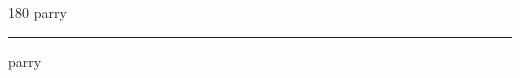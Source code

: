 
\begin{frame}
\begin{center}
\begin{turn}{180}
{\fontsize{2.5cm}{1em}\selectfont parry}
\end{turn}
\vspace{1em}\par  
\hrule
\vspace{1em}\par  
{\fontsize{2.5cm}{1em}\selectfont parry}
\end{center}
\end{frame}
